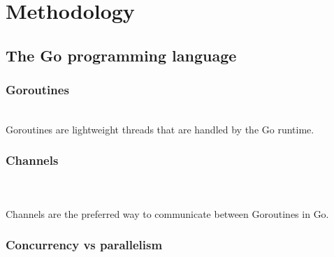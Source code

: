 \chapter{Methodology}
\label{chap:methodology}

\iffalse
The type of research you did
How you collected your data
How you analyzed your data
Any tools or materials you used in the research
Your rationale for choosing these methods
\fi

\section{The Go programming language}
 
\subsection{Goroutines}
\\
Goroutines are lightweight threads that are handled by the Go runtime.
\subsection{Channels}

\\
\\
Channels are the preferred way to communicate between Goroutines in Go.

\subsection{Concurrency vs parallelism}
